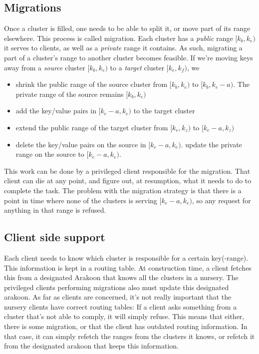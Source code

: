 \subsection{Migrations}
Once a cluster is filled, one needs to be able to split it, or move part of its range elsewhere. This process is called migration.
Each cluster has a \emph{public} range $[k_b,k_e)$ it serves to clients, as well as a \emph{private} range it contains. 
As such, migrating a part of a cluster's range to another cluster becomes feasible. 
If we're moving keys away from a \emph{source} cluster $[k_b,k_e)$ 
to a \emph{target} cluster $[k_e,k_f)$, we
\begin{itemize}
\item{} shrink the public range of the source cluster from 
$[k_b,k_e)$ to $[k_b, k_e - a)$. 
The private range of the source remains $[k_b,k_e)$
\item{} add the key/value pairs in $[k_e - a,k_e)$ to the target cluster
\item{} extend the public range of the target cluster from
$[k_e,k_z)$ to $[k_e - a, k_z)$
\item{} delete the key/value pairs on the source in $[k_e -a,k_e)$.
        update the private range on the source to $[k_e - a, k_e)$.
\end{itemize}
This work can be done by a privileged client responsible for the migration. 
That client can die at any point, and figure out, at resumption, what it needs to do to complete the task. 
The problem with the migration strategy is that there is a point in time where none of the clusters is serving $[k_e -a, k_e)$, so any request for anything in that range is refused.

\subsection{Client side support}
Each client needs to know which cluster is responsible for a certain key(-range). 
This information is kept in a routing table. At construction time, a client fetches this from a designated Arakoon that knows all the clusters in a nursery. 
The privileged clients performing migrations also must update this designated arakoon. 
As far as clients are concerned, it's not really important that the nursery clients have correct routing tables: 
If a client asks something from a cluster that's not able to comply, it will simply refuse. 
This means that either, there is some migration, or that the client has outdated routing information. 
In that case, it can simply refetch the ranges from the clusters it knows, or refetch it from the designated arakoon that keeps this information.
